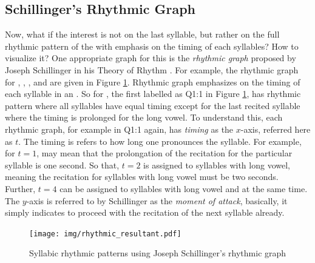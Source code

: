 \subsection{Schillinger's Rhythmic Graph}
Now, what if the interest is not on the last syllable, but rather on the full rhythmic pattern of the   with emphasis on the timing of each syllables? How to visualize it? One appropriate graph for this is the \textit{rhythmic graph} proposed by Joseph Schillinger in his Theory of Rhythm \cite{schillinger1946schillinger}. For example, the rhythmic graph for  ,  ,  , and   are given in Figure \ref{fig:result_syllabic_rhythmic_graph}. Rhythmic graph emphasizes on the timing of each syllable in an  . So for  , the first   labelled as Q1:1 in Figure \ref{fig:result_syllabic_rhythmic_graph}, has rhythmic pattern where all syllables have equal timing except for the last recited syllable where the timing is prolonged for the long vowel. To understand this, each rhythmic graph, for example in Q1:1 again, has \textit{timing} as the $x$-axis, referred here as $t$. The timing is refers to how long one pronounces the syllable. For example, for $t=1$, may mean that the prolongation of the recitation for the particular syllable is one second. So that, $t=2$ is assigned to syllables with long vowel, meaning the recitation for syllables with long vowel must be two seconds. Further, $t=4$ can be assigned to syllables with long vowel and   at the same time. The $y$-axis is referred to by Schillinger as the \textit{moment of attack}, basically, it simply indicates to proceed with the recitation of the next syllable already. 

\begin{figure}[!t]
    \centering
    \texttt{[image: img/rhythmic\_resultant.pdf]}
    \caption{Syllabic rhythmic patterns using Joseph Schillinger's rhythmic graph}
    \label{fig:result_syllabic_rhythmic_graph}
\end{figure}

